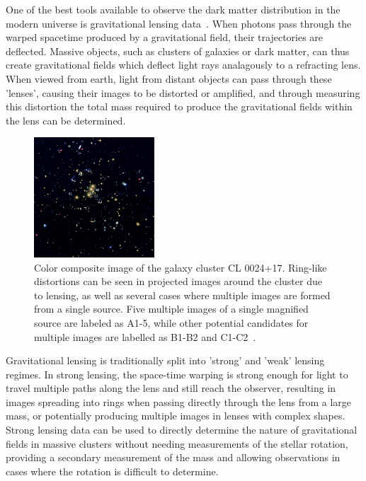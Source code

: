 One of the best tools available to observe the dark matter distribution in the modern universe is gravitational lensing data~\cite{Massey_2010}.
When photons pass through the warped spacetime produced by a gravitational field, their trajectories are deflected.
Massive objects, such as clusters of galaxies or dark matter, can thus create gravitational fields which deflect light rays analagously to a refracting lens.
When viewed from earth, light from distant objects can pass through these 'lenses', causing their images to be distorted or amplified, and through measuring this distortion the total mass required to produce the gravitational fields within the lens can be determined.

\begin{figure}
	\label{fig:gravLensing}
	\centering
	\includegraphics[width=0.4\textwidth]{figures/grav_lensing.jpg}
	\caption[Gravitational lensing of galaxy cluster CL0024+17]{ Color composite image of the galaxy cluster CL 0024+17. Ring-like distortions can be seen in projected images around the cluster due to lensing, as well as several cases where multiple images are formed from a single source. Five multiple images of a single magnified source are labeled as A1-5, while other potential candidates for multiple images are labelled as B1-B2 and C1-C2~\cite{jee2007}.}
\end{figure}

Gravitational lensing is traditionally split into 'strong' and 'weak' lensing regimes. 
In strong lensing, the space-time warping is strong enough for light to travel multiple paths along the lens and still reach the observer, resulting in images spreading into rings when passing directly through the lens from a large mass, or potentially producing multiple images in lenses with complex shapes.
Strong lensing data can be used to directly determine the nature of gravitational fields in massive clusters without needing measurements of the stellar rotation, providing a secondary measurement of the mass and allowing observations in cases where the rotation is difficult to determine.

